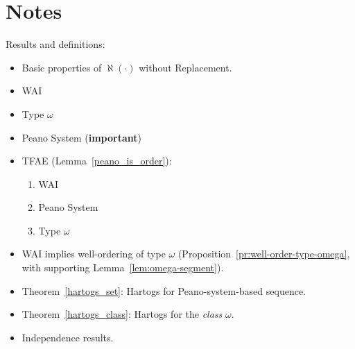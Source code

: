 \section{Notes}

Results and definitions:
\begin{itemize}
\item Basic properties of $\aleph(\cdot)$ without Replacement.
\item WAI
\item Type $\omega$
\item Peano System (\textbf{important})
\item TFAE (Lemma~\ref{peano_is_order}):
  \begin{enumerate}
  \item
    WAI
  \item
    Peano System
  \item
    Type $\omega$
  \end{enumerate}
\item WAI implies well-ordering of type $\omega$
  (Proposition~\ref{pr:well-order-type-omega}, with supporting
  Lemma~\ref{lem:omega-segment}).
\item Theorem~\ref{hartogs_set}: Hartogs for Peano-system-based sequence.
\item Theorem~\ref{hartogs_class}: Hartogs for the \emph{class} $\omega$.
\item Independence results.
\end{itemize}

